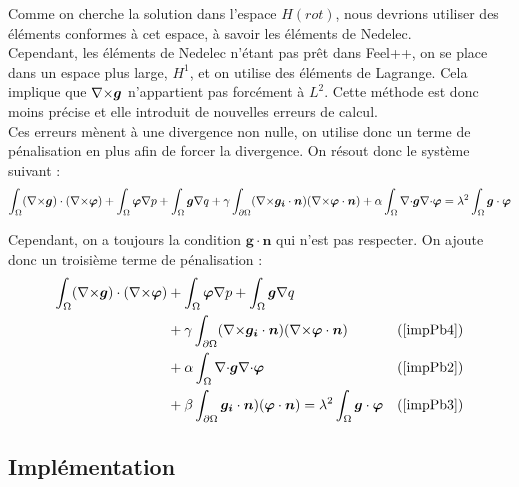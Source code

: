 Comme on cherche la solution dans l'espace $H(rot)$, nous devrions utiliser des éléments conformes à cet espace, à savoir les éléments de Nedelec.\\

Cependant, les éléments de Nedelec n'étant pas prêt dans Feel++, on se place dans un espace plus large, $H^1$, et on utilise des éléments de Lagrange. Cela implique que ${\nabla\times}\bm{g}$ n'appartient pas forcément à $L^2$. Cette méthode est donc moins précise et elle introduit de nouvelles erreurs de calcul.\\

Ces erreurs mènent à une divergence non nulle, on utilise donc un terme de pénalisation en plus afin de forcer la divergence. On résout donc le système suivant :
\[ \int_\Omega ({\nabla\times}\bm{g})\cdot({\nabla\times}\bm{\varphi}) + \int_\Omega\bm{\varphi}{\nabla} p + \int_\Omega \bm{g}{\nabla} q + \gamma\int_{\partial\Omega}({\nabla\times}\bm{g_i}\cdot\bm{n})({\nabla\times}\bm{\varphi}\cdot\bm{n}) + \alpha\int_\Omega {\nabla\cdot}\bm{g}{\nabla\cdot}\bm{\varphi} = \lambda^2\int_\Omega \bm{g}\cdot\bm{\varphi} \]

Cependant, on a toujours la condition $\bm{g}\cdot\bm{n}$ qui n'est pas respecter. On ajoute donc un troisième terme de pénalisation :
\begin{align*}
\int_\Omega ({\nabla\times}\bm{g})\cdot({\nabla\times}\bm{\varphi}) &+ \int_\Omega\bm{\varphi}{\nabla} p + \int_\Omega \bm{g}{\nabla} q & \\
&+ \gamma\int_{\partial\Omega}({\nabla\times}\bm{g_i}\cdot\bm{n})({\nabla\times}\bm{\varphi}\cdot\bm{n}) & (\ref{impPb4})\\
& + \alpha\int_\Omega {\nabla\cdot}\bm{g}{\nabla\cdot}\bm{\varphi} & (\ref{impPb2})\\
&+ \beta\int_{\partial\Omega}\bm{g_i}\cdot\bm{n})(\bm{\varphi}\cdot\bm{n})  = \lambda^2\int_\Omega \bm{g}\cdot\bm{\varphi} & (\ref{impPb3})
\end{align*}

\subsection{Implémentation}

